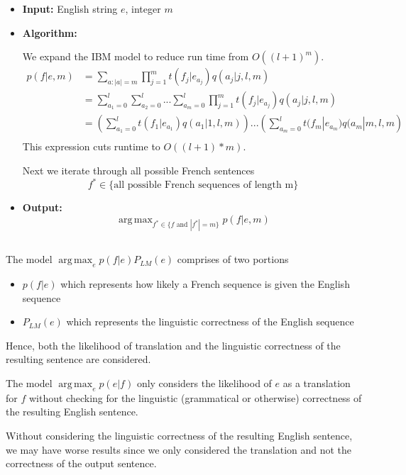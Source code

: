 \documentclass[11pt]{scrartcl}
\DeclareMathOperator*{\argmax}{arg\,max}
\begin{document}
\begin{itemize}
\item \textbf{Input:} English string $e$, integer $m$
\item \textbf{Algorithm:} 

We expand the IBM model to reduce run time from $O((l+1)^m)$.
\begin{align*}
p(f|e,m) &= \sum_{a:|a| = m} \prod^m_{j=1} t(f_j | e_{a_j}) q(a_j | j, l, m) \\
&= \sum^l_{a_1 = 0} \sum^l_{a_2 = 0} ... \sum^l_{a_m = 0} \prod^m_{j=1} t(f_j | e_{a_j}) q(a_j | j, l, m) \\
&= \left( \sum^l_{a_1 = 0} t(f_1 | e_{a_1}) q(a_1 | 1, l, m) \right) ... \left( \sum^l_{a_m = 0} t(f_m | e_{a_m}) q(a_m | m, l, m \right) \\
\end{align*}
This expression cuts runtime to $O((l+1)*m)$.

Next we iterate through all possible French sentences 
\[f^* \in \{\text{all possible French sequences of length m}\}\]

\item \textbf{Output:} 
\[\argmax_{f^* \in \{f \text{ and } |f^*| = m\}} p(f|e,m)\]
\end{itemize}

\subsection{}
The model $\argmax_e p(f|e) P_{LM}(e)$ comprises of two portions

\begin{itemize}
\item $p(f|e)$ which represents how likely a French sequence is given the English sequence
\item $P_{LM} (e)$ which represents the linguistic correctness of the English sequence
\end{itemize}

Hence, both the likelihood of translation and the linguistic correctness of the resulting sentence are considered.

The model $\argmax_e p(e|f)$ only considers the likelihood of $e$ as a translation for $f$ without checking for the linguistic (grammatical or otherwise) correctness of the resulting English sentence.

Without considering the linguistic correctness of the resulting English sentence, we may have worse results since we only considered the translation and not the correctness of the output sentence.
\end{document}

